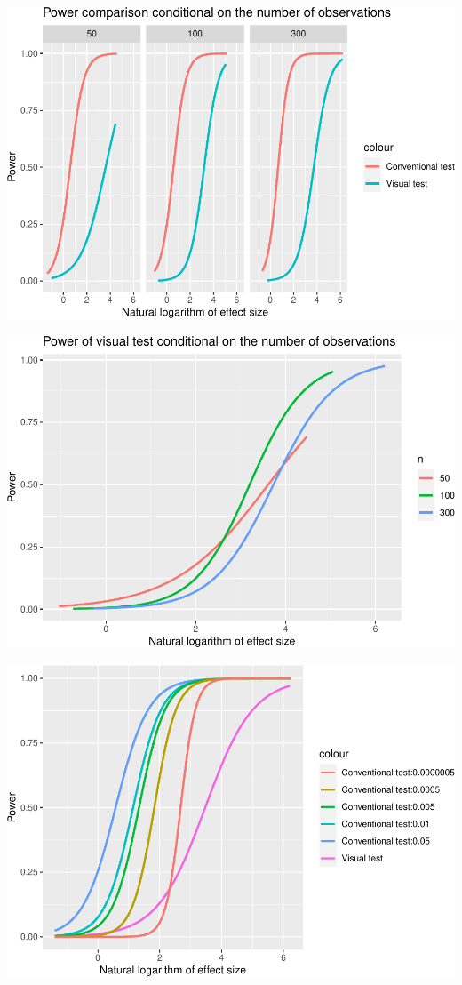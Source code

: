 \documentclass[]{interact}
\theoremstyle{plain}%
\theoremstyle{definition}
\theoremstyle{remark}
\begin{document}
\includegraphics{paper_comparison_files/figure-latex/power-vs-log-effect-size-given-number-of-observations-1.pdf}

\includegraphics{paper_comparison_files/figure-latex/power-of-visual-test-given-number-of-observations-1.pdf}

\includegraphics{paper_comparison_files/figure-latex/unnamed-chunk-19-1.pdf}



\end{document}
